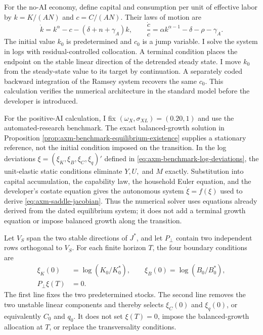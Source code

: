 For the no-AI economy, define capital and consumption per unit of effective
labor by \(k=K/(AN)\) and \(c=C/(AN)\). Their laws of motion are
\begin{equation}
 \dot k=k^\alpha-c-(\delta+n+\gamma_A)k,\qquad
 \frac{\dot c}{c}
 =\alpha k^{\alpha-1}-\delta-\rho-\gamma_A.
 \label{eq:axm-rck-validation-system}
\end{equation}
The initial value \(k_0\) is predetermined and \(c_0\) is a jump variable. I
solve the system in logs with residual-controlled collocation. A terminal
condition places the endpoint on the stable linear direction of the
detrended steady state. I move \(k_0\) from the steady-state value to its
target by continuation. A separately coded backward integration of the Ramsey
system recovers the same \(c_0\). This calculation verifies the numerical
architecture in the standard model before the developer is introduced.

For the positive-AI calculation, I fix
\((\omega_X,\sigma_{XL})=(0.20,1)\) and use the automated-research benchmark.
The exact balanced-growth solution in Proposition
\ref{prop:axm-benchmark-equilibrium-existence} supplies a stationary reference,
not the initial condition imposed on the transition. In the log deviations
\(\xi=(\xi_K,\xi_B,\xi_C,\xi_q)'\) defined in
\eqref{eq:axm-benchmark-log-deviations}, the unit-elastic static conditions
eliminate \(Y,U,\) and \(M\) exactly. Substitution into capital accumulation,
the capability law, the household Euler equation, and the developer's costate
equation gives the autonomous system \(\dot\xi=f(\xi)\) used to derive
\eqref{eq:axm-saddle-jacobian}. Thus the numerical solver uses equations
already derived from the dated equilibrium system; it does not add a terminal
growth equation or impose balanced growth along the transition.

Let \(V_S\) span the two stable directions of \(J^*\), and let
\(P_\perp\) contain two independent rows orthogonal to \(V_S\). For each
finite horizon \(T\), the four boundary conditions are
\begin{equation}
 \begin{split}
 \xi_K(0)&=\log(K_0/K_0^*),\qquad
 \xi_B(0)=\log(B_0/B_0^*),\\
 P_\perp\xi(T)&=0.
 \end{split}
 \label{eq:axm-positive-ai-stable-boundary}
\end{equation}
The first line fixes the two predetermined stocks. The second line removes the
two unstable linear components and thereby selects \(\xi_C(0)\) and
\(\xi_q(0)\), or equivalently \(C_0\) and \(q_0\). It does not set
\(\xi(T)=0\), impose the balanced-growth allocation at \(T\), or replace the
transversality conditions.

